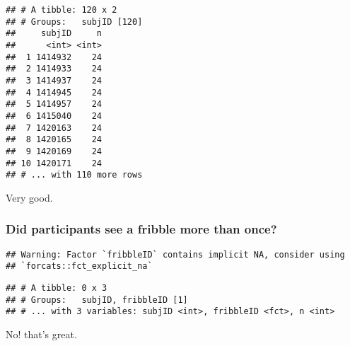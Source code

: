 \documentclass[
]{article}
\newenvironment{Shaded}{\begin{snugshade}}{\end{snugshade}}
\newcommand{\DecValTok}[1]{\textcolor[rgb]{0.00,0.00,0.81}{#1}}
\newcommand{\KeywordTok}[1]{\textcolor[rgb]{0.13,0.29,0.53}{\textbf{#1}}}
\newcommand{\NormalTok}[1]{#1}
\newcommand{\OperatorTok}[1]{\textcolor[rgb]{0.81,0.36,0.00}{\textbf{#1}}}
\newcommand{\StringTok}[1]{\textcolor[rgb]{0.31,0.60,0.02}{#1}}
\begin{document}
\begin{Shaded}
\end{Shaded}

\begin{verbatim}
## # A tibble: 120 x 2
## # Groups:   subjID [120]
##     subjID     n
##      <int> <int>
##  1 1414932    24
##  2 1414933    24
##  3 1414937    24
##  4 1414945    24
##  5 1414957    24
##  6 1415040    24
##  7 1420163    24
##  8 1420165    24
##  9 1420169    24
## 10 1420171    24
## # ... with 110 more rows
\end{verbatim}

Very good.

\hypertarget{did-participants-see-a-fribble-more-than-once}{%
\subsubsection{Did participants see a fribble more than
once?}\label{did-participants-see-a-fribble-more-than-once}}

\begin{Shaded}
\end{Shaded}

\begin{verbatim}
## Warning: Factor `fribbleID` contains implicit NA, consider using
## `forcats::fct_explicit_na`
\end{verbatim}

\begin{verbatim}
## # A tibble: 0 x 3
## # Groups:   subjID, fribbleID [1]
## # ... with 3 variables: subjID <int>, fribbleID <fct>, n <int>
\end{verbatim}

No! that's great.
\end{document}
